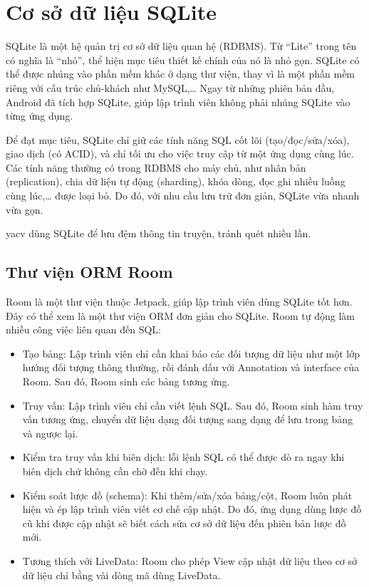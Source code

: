 \documentclass[../../thesis]{subfiles}
\begin{document}

\section{Cơ sở dữ liệu SQLite}

SQLite là một hệ quản trị cơ sở dữ liệu quan hệ (RDBMS). Từ ``Lite'' trong tên
có nghĩa là ``nhỏ'', thể hiện mục tiêu thiết kế chính của nó là nhỏ gọn. SQLite
có thể được nhúng vào phần mềm khác ở dạng thư viện, thay vì là một phần mềm
riêng với cấu trúc chủ-khách như MySQL,\ldots{} Ngay từ những phiên bản đầu,
Android đã tích hợp SQLite, giúp lập trình viên không phải nhúng SQLite vào từng
ứng dụng.

Để đạt mục tiêu, SQLite chỉ giữ các tính năng SQL cốt lõi (tạo/đọc/sửa/xóa),
giao dịch (có ACID), và chỉ tối ưu cho việc truy cập từ một ứng dụng cùng lúc.
Các tính năng thường có trong RDBMS cho máy chủ, như nhân bản (replication),
chia dữ liệu tự động (sharding), khóa dòng, đọc ghi nhiều luồng cùng
lúc,\ldots{} được loại bỏ. Do đó, với nhu cầu lưu trữ đơn giản, SQLite vừa nhanh
vừa gọn.

yacv dùng SQLite để lưu đệm thông tin truyện, tránh quét nhiều lần.

\subsection{Thư viện ORM Room}

Room là một thư viện thuộc Jetpack, giúp lập trình viên dùng SQLite tốt hơn. Đây
có thể xem là một thư viện ORM đơn giản cho SQLite. Room tự động làm nhiều công
việc liên quan đến SQL:

\begin{itemize}
    \item
        Tạo bảng: Lập trình viên chỉ cần khai báo các đối tượng dữ liệu như một
        lớp hướng đối tượng thông thường, rồi đánh dấu với Annotation và
        interface của Room. Sau đó, Room sinh các bảng tương ứng.
    \item
        Truy vấn: Lập trình viên chỉ cần viết lệnh SQL. Sau đó, Room sinh hàm
        truy vấn tương ứng, chuyển dữ liệu dạng đối tượng sang dạng để lưu trong
        bảng và ngược lại.
    \item
        Kiểm tra truy vấn khi biên dịch: lỗi lệnh SQL có thể được dò ra ngay khi
        biên dịch chứ không cần chờ đến khi chạy.
    \item
        Kiểm soát lược đồ (schema): Khi thêm/sửa/xóa bảng/cột, Room luôn phát
        hiện và ép lập trình viên viết cơ chế cập nhật. Do đó, ứng dụng dùng
        lược đồ cũ khi được cập nhật sẽ biết cách sửa cơ sở dữ liệu đến phiên
        bản lược đồ mới.
    \item
        Tương thích với LiveData: Room cho phép View cập nhật dữ liệu theo cơ sở
        dữ liệu chỉ bằng vài dòng mã dùng LiveData.
\end{itemize}
\end{document}

